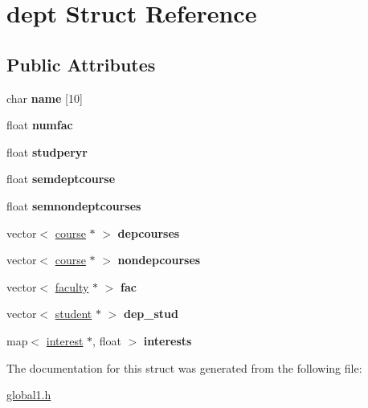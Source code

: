 \hypertarget{structdept}{\section{dept \-Struct \-Reference}
\label{structdept}
}
\subsection*{\-Public \-Attributes}
\begin{DoxyCompactItemize}
\item 
\hypertarget{structdept_a01bf5ea110a81ac60f3cf46f0ef45d74}{char {\bfseries name} \mbox{[}10\mbox{]}}\label{structdept_a01bf5ea110a81ac60f3cf46f0ef45d74}

\item 
\hypertarget{structdept_aa02d5cf75a5dad61cd243d873ba472ea}{float {\bfseries numfac}}\label{structdept_aa02d5cf75a5dad61cd243d873ba472ea}

\item 
\hypertarget{structdept_a27cc8ba8fd22c255215ca27e09c818e4}{float {\bfseries studperyr}}\label{structdept_a27cc8ba8fd22c255215ca27e09c818e4}

\item 
\hypertarget{structdept_a03a4ba260fd314156b15384b89184f63}{float {\bfseries semdeptcourse}}\label{structdept_a03a4ba260fd314156b15384b89184f63}

\item 
\hypertarget{structdept_af56d6e7ea9c8f796f7e27812e1c9c8fe}{float {\bfseries semnondeptcourses}}\label{structdept_af56d6e7ea9c8f796f7e27812e1c9c8fe}

\item 
\hypertarget{structdept_a9b5e133e183a8f209d285618ac1acb52}{vector$<$ \hyperlink{structcourse}{course} $\ast$ $>$ {\bfseries depcourses}}\label{structdept_a9b5e133e183a8f209d285618ac1acb52}

\item 
\hypertarget{structdept_adc8c02e50e5238af4f1794fdc45735d3}{vector$<$ \hyperlink{structcourse}{course} $\ast$ $>$ {\bfseries nondepcourses}}\label{structdept_adc8c02e50e5238af4f1794fdc45735d3}

\item 
\hypertarget{structdept_af5b698d8962e10e926634ac9b717cb89}{vector$<$ \hyperlink{structfaculty}{faculty} $\ast$ $>$ {\bfseries fac}}\label{structdept_af5b698d8962e10e926634ac9b717cb89}

\item 
\hypertarget{structdept_a65e756bf8e0cc16a3e51e5ab01d2e16f}{vector$<$ \hyperlink{structstudent}{student} $\ast$ $>$ {\bfseries dep\-\_\-stud}}\label{structdept_a65e756bf8e0cc16a3e51e5ab01d2e16f}

\item 
\hypertarget{structdept_aac4e05f471dea00699d853e3fb838131}{map$<$ \hyperlink{structinterest}{interest} $\ast$, float $>$ {\bfseries interests}}\label{structdept_aac4e05f471dea00699d853e3fb838131}

\end{DoxyCompactItemize}


\-The documentation for this struct was generated from the following file\-:\begin{DoxyCompactItemize}
\item 
\hyperlink{global1_8h}{global1.\-h}\end{DoxyCompactItemize}
